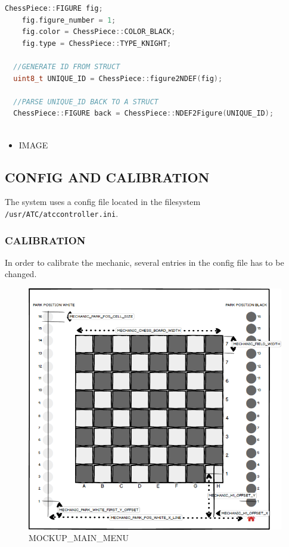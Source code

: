 \documentclass[
  english,
  paper=a4,
  ,captions=tableheading
]{scrartcl}
\newcommand{\passthrough}[1]{#1}
\providecommand{\tightlist}{%
  \setlength{\itemsep}{0pt}\setlength{\parskip}{0pt}}
\begin{document}
\begin{lstlisting}[language={C++}]
  ChessPiece::FIGURE fig;
    fig.figure_number = 1;
    fig.color = ChessPiece::COLOR_BLACK;
    fig.type = ChessPiece::TYPE_KNIGHT;
  
  //GENERATE ID FROM STRUCT
  uint8_t UNIQUE_ID = ChessPiece::figure2NDEF(fig);
  
  //PARSE UNIQUE_ID BACK TO A STRUCT
  ChessPiece::FIGURE back = ChessPiece::NDEF2Figure(UNIQUE_ID);
  
\end{lstlisting}

\begin{itemize}
\tightlist
\item
  IMAGE
\end{itemize}

\hypertarget{config-and-calibration}{%
\subsection{CONFIG AND CALIBRATION}\label{config-and-calibration}}

The system uses a config file located in the filesystem
\passthrough{\lstinline!/usr/ATC/atccontroller.ini!}.

\hypertarget{calibration}{%
\subsubsection{CALIBRATION}\label{calibration}}

In order to calibrate the mechanic, several entries in the config file
has to be changed.

\begin{figure}
\centering
\includegraphics{./images/ATC_Calibration_Guide.png}
\caption{MOCKUP\_MAIN\_MENU}
\end{figure}
\end{document}
